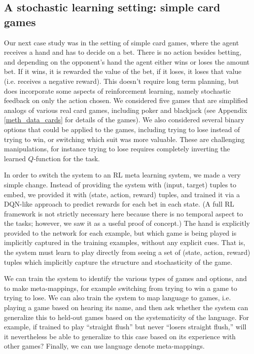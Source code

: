 \documentclass{article}
\begin{document}
\subsection{A stochastic learning setting: simple card games}
Our next case study was in the setting of simple card games, where the agent receives a hand and has to decide on a bet. There is no action besides betting, and depending on the opponent's hand the agent either wins or loses the amount bet. If it wins, it is rewarded the value of the bet, if it loses, it loses that value (i.e. receives a negative reward). This doesn't require long term planning, but does incorporate some aspects of reinforcement learning, namely stochastic feedback on only the action chosen. We considered five games that are simplified analogs of various real card games, including poker and blackjack (see Appendix \ref{meth_data_cards} for details of the games). We also considered several binary options that could be applied to the games, including trying to lose instead of trying to win, or switching which suit was more valuable. These are challenging manipulations, for instance trying to lose requires completely inverting the learned $Q$-function for the task. \par
In order to switch the system to an RL meta learning system, we made a very simple change. Instead of providing the system with (input, target) tuples to embed, we provided it with (state, action, reward) tuples, and trained it via a DQN-like approach \citep{Mnih2015} to predict rewards for each bet in each state. (A full RL framework is not strictly necessary here because there is no temporal aspect to the tasks; however, we saw it as a useful proof of concept.) The hand is explicitly provided to the network for each example, but which game is being played is implicitly captured in the training examples, without any explicit cues. That is, the system must learn to play directly from seeing a set of (state, action, reward) tuples which implicitly capture the structure and stochasticity of the game. \par   
We can train the system to identify the various types of games and options, and to make meta-mappings, for example switching from trying to win a game to trying to lose. We can also train the system to map language to games, i.e. playing a game based on hearing its name, and then ask whether the system can generalize this to held-out games based on the systematicity of the language. For example, if trained to play ``straight flush'' but never ``losers straight flush,'' will it nevertheless be able to generalize to this case based on its experience with other games? Finally, we can use language denote meta-mappings. \par
\end{document}
